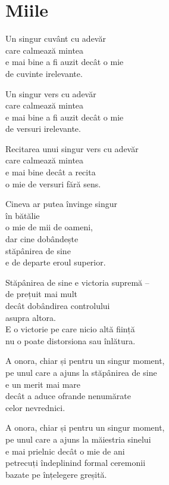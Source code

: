 
\chapter{Miile}


Un singur cuvânt cu adevăr\\
care calmează mintea\\
e mai bine a fi auzit decât o mie\\
de cuvinte irelevante.


Un singur vers cu adevăr\\
care calmează mintea\\
e mai bine a fi auzit decât o mie\\
de versuri irelevante.


Recitarea unui singur vers cu adevăr\\
care calmează mintea\\
e mai bine decât a recita\\
o mie de versuri fără sens.


Cineva ar putea învinge singur\\
în bătălie\\
o mie de mii de oameni,\\
dar cine dobândește\\
stăpânirea de sine\\
e de departe eroul superior.


Stăpânirea de sine e victoria supremă –\\
de prețuit mai mult\\
decât dobândirea controlului\\
asupra altora.\\
E o victorie pe care nicio altă ființă\\
nu o poate distorsiona sau înlătura.


A onora, chiar și pentru un singur moment,\\
pe unul care a ajuns la stăpânirea de sine\\
e un merit mai mare\\
decât a aduce ofrande nenumărate\\
celor nevrednici.


A onora, chiar și pentru un singur moment,\\
pe unul care a ajuns la măiestria sinelui\\
e mai prielnic decât o mie de ani\\
petrecuți îndeplinind formal ceremonii\\
bazate pe înțelegere greșită.

